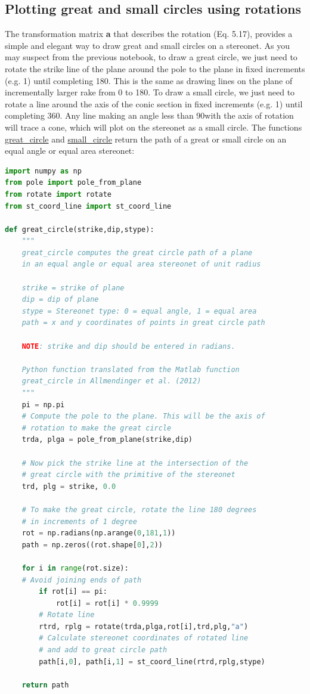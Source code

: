 \documentclass[a4paper , 12pt]{book}
\begin{document}
\subsection{Plotting great and small circles using rotations}

The transformation matrix \textbf{a} that describes the rotation (Eq. 5.17), provides a simple and elegant way to draw great and small circles on a stereonet. As you may suspect from the previous notebook, to draw a great circle, we just need to rotate the strike line of the plane around the pole to the plane in fixed increments (e.g. 1\degree) until completing 180\degree. This is the same as drawing lines on the plane of incrementally larger rake from 0 to 180\degree. To draw a small circle, we just need to rotate a line around the axis of the conic section in fixed increments (e.g. 1\degree\space) until completing 360\degree. Any line making an angle less than 90\degree\space with the axis of rotation will trace a cone, which will plot on the stereonet as a small circle. The functions \href{https://github.com/nfcd/compGeo/blob/master/source/functions/great_circle.py}{great\_circle} and \href{https://github.com/nfcd/compGeo/blob/master/source/functions/small_circle.py}{small\_circle} return the path of a great or small circle on an equal angle or equal area stereonet:

\begin{center}
\begin{lstlisting}[language=Python, frame=single]
import numpy as np
from pole import pole_from_plane
from rotate import rotate
from st_coord_line import st_coord_line

def great_circle(strike,dip,stype):
	"""
	great_circle computes the great circle path of a plane
	in an equal angle or equal area stereonet of unit radius
	
	strike = strike of plane
	dip = dip of plane
	stype = Stereonet type: 0 = equal angle, 1 = equal area
	path = x and y coordinates of points in great circle path
	
	NOTE: strike and dip should be entered in radians.
	
	Python function translated from the Matlab function
	great_circle in Allmendinger et al. (2012)
	"""
	pi = np.pi
	# Compute the pole to the plane. This will be the axis of
	# rotation to make the great circle
	trda, plga = pole_from_plane(strike,dip)
	
	# Now pick the strike line at the intersection of the
	# great circle with the primitive of the stereonet
	trd, plg = strike, 0.0
	
	# To make the great circle, rotate the line 180 degrees
	# in increments of 1 degree
	rot = np.radians(np.arange(0,181,1))
	path = np.zeros((rot.shape[0],2))
	
	for i in range(rot.size):
	# Avoid joining ends of path
		if rot[i] == pi:
			rot[i] = rot[i] * 0.9999
		# Rotate line
		rtrd, rplg = rotate(trda,plga,rot[i],trd,plg,"a")
		# Calculate stereonet coordinates of rotated line
		# and add to great circle path
		path[i,0], path[i,1] = st_coord_line(rtrd,rplg,stype)
	
	return path
\end{lstlisting}
\end{center}
\end{document}
